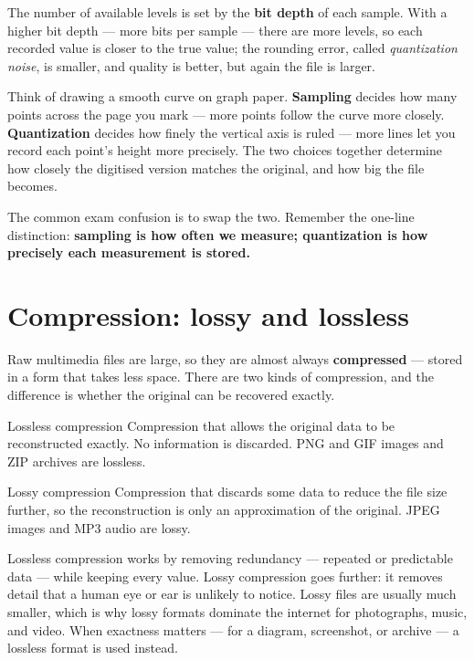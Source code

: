 The number of available levels is set by the \textbf{bit depth} of each
sample. With a higher bit depth --- more bits per sample --- there are more
levels, so each recorded value is closer to the true value; the rounding
error, called \emph{quantization noise}, is smaller, and quality is better,
but again the file is larger.

\begin{example}
Think of drawing a smooth curve on graph paper. \textbf{Sampling} decides how
many points across the page you mark --- more points follow the curve more
closely. \textbf{Quantization} decides how finely the vertical axis is ruled
--- more lines let you record each point's height more precisely. The two
choices together determine how closely the digitised version matches the
original, and how big the file becomes.
\end{example}

The common exam confusion is to swap the two. Remember the one-line
distinction: \textbf{sampling is how often we measure; quantization is how
precisely each measurement is stored.}

\section{Compression: lossy and lossless}
Raw multimedia files are large, so they are almost always \textbf{compressed}
--- stored in a form that takes less space. There are two kinds of
compression, and the difference is whether the original can be recovered
exactly.

\begin{definitionbox}{Lossless compression}
Compression that allows the original data to be reconstructed exactly. No
information is discarded. PNG and GIF images and ZIP archives are lossless.
\end{definitionbox}

\begin{definitionbox}{Lossy compression}
Compression that discards some data to reduce the file size further, so the
reconstruction is only an approximation of the original. JPEG images and MP3
audio are lossy.
\end{definitionbox}

Lossless compression works by removing redundancy --- repeated or predictable
data --- while keeping every value. Lossy compression goes further: it removes
detail that a human eye or ear is unlikely to notice. Lossy files are usually
much smaller, which is why lossy formats dominate the internet for
photographs, music, and video. When exactness matters --- for a diagram,
screenshot, or archive --- a lossless format is used instead.

